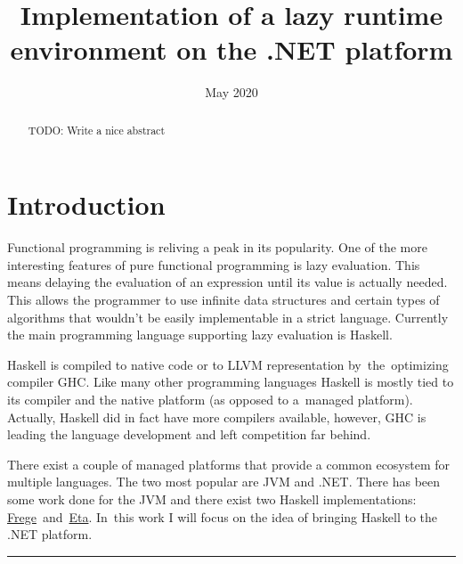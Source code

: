 \documentclass[en]{pracamgr}
\title{Implementation of a lazy runtime environment on the .NET platform}
\date{May 2020}
\begin{document}
\maketitle

\begin{abstract}
  TODO: Write a nice abstract
\end{abstract}

\tableofcontents

\chapter*{Introduction}

Functional programming is reliving a peak in its popularity.
One of the more interesting features of pure functional programming
is lazy evaluation. This means delaying the evaluation of an expression
until its value is actually needed. This allows the programmer to use
infinite data structures and certain types of algorithms that wouldn't
be easily implementable in a strict language.
Currently the main programming language
supporting lazy evaluation is Haskell.

Haskell is compiled to native code or to LLVM representation by~the~optimizing
compiler GHC. Like many other programming languages Haskell is mostly
tied to its compiler and the native platform (as opposed to a~managed platform).
Actually, Haskell did in fact have more compilers available, however,
GHC is leading the language development and left competition far behind.

There exist a couple of managed platforms that provide a common ecosystem
for multiple languages. The two most popular are JVM and .NET.
There has been some work done for the JVM \cite{Tullsen} \cite{Choi} \cite{Stewart}
and there exist two Haskell implementations: 
\href{https://github.com/Frege/frege}{Frege}~and~\href{https://eta-lang.org/}{Eta}.
In~this work I will focus on the idea of bringing
Haskell to the .NET platform.

{
    \centering \rule[3pt]{9cm}{.3pt}

}
\end{document}
